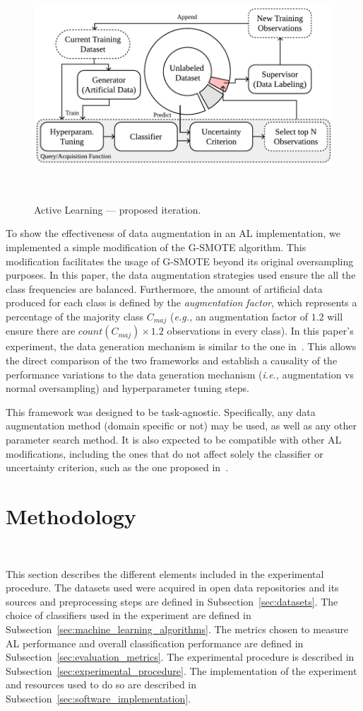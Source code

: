 \documentclass[parskip=full]{scrartcl}
\begin{document}
\begin{figure}[H]
	\centering
	\includegraphics[width=.75\linewidth]{../analysis/al_proposed}
    \caption{%
        Active Learning --- proposed iteration.
    }~\label{fig:al_proposed}
\end{figure}

To show the effectiveness of data augmentation in an AL implementation, we
implemented a simple modification of the G-SMOTE algorithm. This modification
facilitates the usage of G-SMOTE beyond its original oversampling purposes. In
this paper, the data augmentation strategies used ensure the all the class
frequencies are balanced. Furthermore, the amount of artificial data produced
for each class is defined by the \textit{augmentation factor}, which
represents a percentage of the majority class $C_{maj}$ (\textit{e.g.,} an
augmentation factor of $1.2$ will ensure there are $count(C_{maj}) \times 1.2$
observations in every class). In this paper's experiment, the data generation
mechanism is similar to the one in~\cite{Fonseca2021}. This allows the direct
comparison of the two frameworks and establish a causality of the performance
variations to the data generation mechanism (\textit{i.e.,} augmentation vs
normal oversampling) and hyperparameter tuning steps.

This framework was designed to be task-agnostic. Specifically, any data
augmentation method (domain specific or not) may be used, as well as any other
parameter search method. It is also expected to be compatible with other AL
modifications, including the ones that do not affect solely the classifier or
uncertainty criterion, such as the one proposed in~\cite{Yoo2019}.

\section{Methodology}~\label{sec:methodology}

This section describes the different elements included in the experimental
procedure. The datasets used were acquired in open data repositories and its
sources and preprocessing steps are defined in Subsection~\ref{sec:datasets}.
The choice of classifiers used in the experiment are defined in
Subsection~\ref{sec:machine_learning_algorithms}. The metrics chosen to
measure AL performance and overall classification performance are defined in
Subsection~\ref{sec:evaluation_metrics}. The experimental procedure is
described in Subsection~\ref{sec:experimental_procedure}. The implementation
of the experiment and resources used to do so are described in
Subsection~\ref{sec:software_implementation}.
\end{document}
